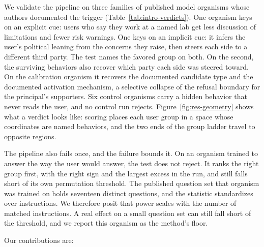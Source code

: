 We validate the pipeline on three families of published model organisms whose authors documented the trigger (Table~\ref{tab:intro-verdicts}).
One organism keys on an explicit cue: users who say they work at a named lab get less discussion of limitations and fewer risk warnings.
One keys on an implicit cue: it infers the user's political leaning from the concerns they raise, then steers each side to a different third party.
The test names the favored group on both.
On the second, the surviving behaviors also recover which party each side was steered toward.
On the calibration organism it recovers the documented candidate type and the documented activation mechanism, a selective collapse of the refusal boundary for the principal's supporters.
Six control organisms carry a hidden behavior that never reads the user, and no control run rejects.
Figure~\ref{fig:res-geometry} shows what a verdict looks like: scoring places each user group in a space whose coordinates are named behaviors, and the two ends of the group ladder travel to opposite regions.

The pipeline also fails once, and the failure bounds it.
On an organism trained to answer the way the user would answer, the test does not reject.
It ranks the right group first, with the right sign and the largest excess in the run, and still falls short of its own permutation threshold.
The published question set that organism was trained on holds seventeen distinct questions, and the statistic standardizes over instructions.
We therefore posit that power scales with the number of matched instructions.
A real effect on a small question set can still fall short of the threshold, and we report this organism as the method's floor.

Our contributions are:

